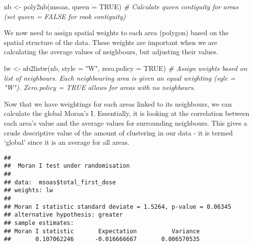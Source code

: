 \documentclass[
]{book}
\newenvironment{Shaded}{\begin{snugshade}}{\end{snugshade}}
\newcommand{\AttributeTok}[1]{\textcolor[rgb]{0.77,0.63,0.00}{#1}}
\newcommand{\CommentTok}[1]{\textcolor[rgb]{0.56,0.35,0.01}{\textit{#1}}}
\newcommand{\ConstantTok}[1]{\textcolor[rgb]{0.00,0.00,0.00}{#1}}
\newcommand{\FunctionTok}[1]{\textcolor[rgb]{0.00,0.00,0.00}{#1}}
\newcommand{\NormalTok}[1]{#1}
\newcommand{\OtherTok}[1]{\textcolor[rgb]{0.56,0.35,0.01}{#1}}
\newcommand{\SpecialCharTok}[1]{\textcolor[rgb]{0.00,0.00,0.00}{#1}}
\newcommand{\StringTok}[1]{\textcolor[rgb]{0.31,0.60,0.02}{#1}}
\begin{document}
\begin{Shaded}
\begin{Highlighting}[]
\NormalTok{nb }\OtherTok{\textless{}{-}} \FunctionTok{poly2nb}\NormalTok{(msoas, }\AttributeTok{queen =} \ConstantTok{TRUE}\NormalTok{) }\CommentTok{\# Calculate queen contiguity for areas (set queen = FALSE for rook contiguity)}
\end{Highlighting}
\end{Shaded}

We now need to assign spatial weights to each area (polygon) based on the spatial structure of the data. These weights are important when we are calculating the average values of neighbours, but adjusting their values.

\begin{Shaded}
\begin{Highlighting}[]
\NormalTok{lw }\OtherTok{\textless{}{-}} \FunctionTok{nb2listw}\NormalTok{(nb, }\AttributeTok{style =} \StringTok{"W"}\NormalTok{, }\AttributeTok{zero.policy =} \ConstantTok{TRUE}\NormalTok{) }\CommentTok{\# Assign weights based on list of neighbours. Each neighbouring area is given an equal weighting (syle = "W"). Zero.policy = TRUE allows for areas with no neighbours.}
\end{Highlighting}
\end{Shaded}

Now that we have weightings for each areas linked to its neighbours, we can calculate the global Moran's I. Essentially, it is looking at the correlation between each area's value and the average values for surrounding neighbours. This gives a crude descriptive value of the amount of clustering in our data - it is termed `global' since it is an average for all areas.

\begin{Shaded}
\end{Shaded}

\begin{verbatim}
## 
##  Moran I test under randomisation
## 
## data:  msoas$total_first_dose  
## weights: lw    
## 
## Moran I statistic standard deviate = 1.5264, p-value = 0.06345
## alternative hypothesis: greater
## sample estimates:
## Moran I statistic       Expectation          Variance 
##       0.107062246      -0.016666667       0.006570535
\end{verbatim}
\end{document}
